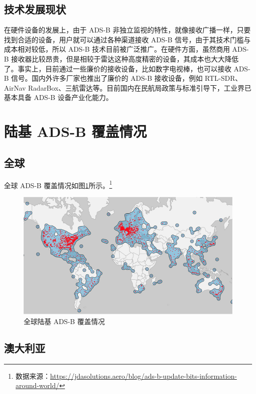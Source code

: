 \subsection{技术发展现状}

在硬件设备的发展上，由于 ADS-B 非独立监视的特性，就像接收广播一样，只要找到合适的设备，用户就可以通过各种渠道接收 ADS-B 信号，由于其技术门槛与
成本相对较低，所以 ADS-B 技术目前被广泛推广。在硬件方面，虽然商用 ADS-B 接收器比较昂贵，但是相较于雷达这种高度精密的设备，其成本也大大降低了。事实上，目前通过一些廉价的接收设备，比如数字电视棒，也可以接收 ADS-B 信号。国内外许多厂家也推出了廉价的 ADS-B 接收设备，例如 RTL-SDR、AirNav RadarBox、三航雷达等。目前国内在民航局政策与标准引导下，工业界已基本具备 ADS-B 设备产业化能力。

\section{陆基 ADS-B 覆盖情况}

\subsection{全球}

全球 ADS-B 覆盖情况如图\ref{fig:1ADS-B-coverage}所示。\footnote{数据来源：\url{https://jdasolutions.aero/blog/ads-b-update-bits-information-around-world/}}

\begin{figure}[htbp]
\centering
\includegraphics[width=14cm]{pic/1ADS-B-coverage.png}
\caption{全球陆基 ADS-B 覆盖情况}
\label{fig:1ADS-B-coverage}
\end{figure}

\subsection{澳大利亚}

